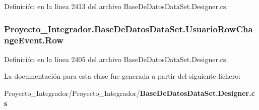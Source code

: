 Definición en la línea 2413 del archivo Base\-De\-Datos\-Data\-Set.\-Designer.\-cs.

\subsubsection[{Row}]{ Proyecto\-\_\-\-Integrador.\-Base\-De\-Datos\-Data\-Set.\-Usuario\-Row\-Change\-Event.\-Row\hspace{0.3cm}{\ttfamily [get]}}\label{class_proyecto___integrador_1_1_base_de_datos_data_set_1_1_usuario_row_change_event_a5a9393d258fa190a3e417db4501f4a75}


Definición en la línea 2405 del archivo Base\-De\-Datos\-Data\-Set.\-Designer.\-cs.



La documentación para esta clase fue generada a partir del siguiente fichero\-:\begin{DoxyCompactItemize}
\item 
Proyecto\-\_\-\-Integrador/\-Proyecto\-\_\-\-Integrador/{\bf Base\-De\-Datos\-Data\-Set.\-Designer.\-cs}\end{DoxyCompactItemize}
